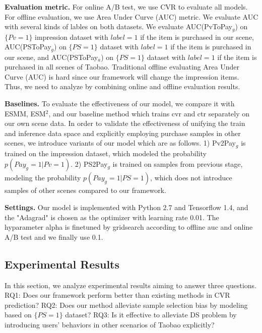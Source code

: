 \documentclass[sigconf]{acmart}
\begin{document}
\textbf{Evaluation metric.} For online A/B test, we use CVR to evaluate all models.
For offline evaluation, we use Area Under Curve (AUC) metric. We evaluate AUC with several kinds of lables on both datasets. We evaluate AUC(PvToPay$_g$) on $\{Pv=1\}$ impression dataset with $label=1$ if the item is purchased in our scene, AUC(PSToPay$_g$) on $\{PS=1\}$ dataset with $label=1$ if the item is purchased in our scene, and AUC(PSToPay$_a$) on $\{PS=1\}$ dataset with $label=1$ if the item is purchased in all scenes of Taobao. 
Traditional offline evaluating Area Under Curve (AUC) is hard since our framework will change the impression items. Thus, we need to analyze by combining online and offline evaluation results.

\textbf{Baselines.} To evaluate the effectiveness of our model, we compare it with ESMM\cite{2018ESMM}, ESM$^2$\cite{2020ESM}, and our baseline method which trains cvr and ctr separately on our own scene data. 
In order to validate the effectiveness of unifying the train and inference data space and explicitly employing purchase samples in other scenes, we introduce variants of our model which are as follows.
1) Pv2Pay$_g$ is trained on the impression dataset, which modeled the probability $p(Pay_g=1|Pv=1)$. 
2) PS2Pay$_g$ is trained on samples from previous stage, modeling the probability $p(Pay_g=1|PS=1)$, which does not introduce samples of other scenes compared to our framework.

\textbf{Settings.} Our model is implemented with Python 2.7 and Tensorflow 1.4, and the "Adagrad" is chosen as the optimizer with learning rate 0.01. The hyparameter alpha is finetuned by gridsearch according to offline auc and online A/B test and we finally use 0.1.

\subsection{Experimental Results}


In this section, we analyze experimental results aiming to answer three questions. RQ1: Does our framework perform better than existing methods in CVR prediction? RQ2: Does our method alleviate sample selection bias by modeling based on $\{PS=1\}$ dataset? RQ3: Is it effective to alleviate DS problem by introducing users' behaviors in other scenarios of Taobao explicitly?
\end{document}
